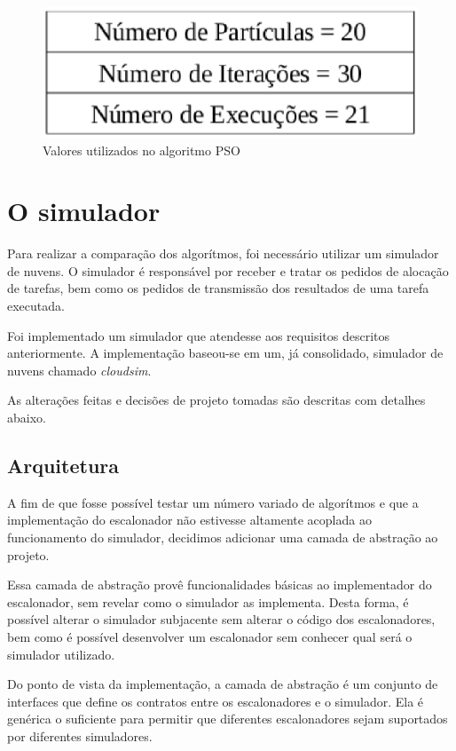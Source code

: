 \documentclass[a4paper,10pt]{article}
\begin{document}
\begin{figure}[!htb]
\centering
\includegraphics[scale=.4]{figures/valuesPSO.eps}
\caption{Valores utilizados no algoritmo PSO}
\label{psoValues}
\end{figure}

\section{O simulador}

Para realizar a comparação dos algorítmos, foi necessário utilizar um simulador de nuvens. O simulador é
responsável por receber e tratar os pedidos de alocação de tarefas, bem como os pedidos de transmissão dos
resultados de uma tarefa executada.

Foi implementado um simulador que atendesse aos requisitos descritos anteriormente. A implementação baseou-se
em um, já consolidado, simulador de nuvens chamado \emph{cloudsim}\cite{cloudsim}.

As alterações feitas e decisões de projeto tomadas são descritas com detalhes abaixo.

\subsection{Arquitetura}

A fim de que fosse possível testar um número variado de algorítmos e que a implementação do escalonador
não estivesse altamente acoplada ao funcionamento do simulador, decidimos adicionar uma camada de abstração
ao projeto.

Essa camada de abstração provê funcionalidades básicas ao implementador do escalonador, sem revelar como o
simulador as implementa. Desta forma, é possível alterar o simulador subjacente sem alterar o código dos escalonadores,
bem como é possível desenvolver um escalonador sem conhecer qual será o simulador utilizado.

Do ponto de vista da implementação, a camada de abstração é um conjunto de interfaces que define os contratos
entre os escalonadores e o simulador.
Ela é genérica o suficiente para permitir que diferentes escalonadores sejam suportados por diferentes simuladores.
\end{document}
